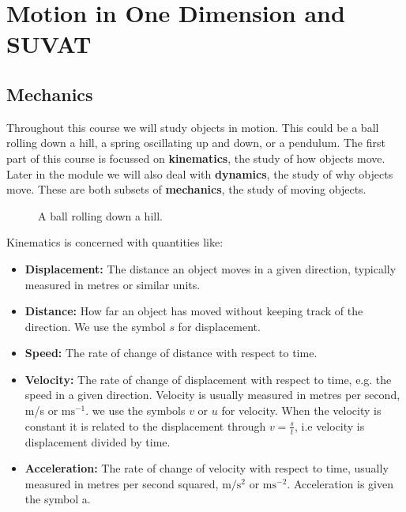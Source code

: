 
\chapter{Motion in One Dimension and SUVAT}
\label{sec: motion in 1D}
\section{Mechanics}
Throughout this course we will study objects in motion. This could be a ball rolling down a hill, a spring oscillating up and down, or a pendulum. The first part of this course is focussed on \textbf{kinematics}, the study of how objects move. Later in the module we will also deal with \textbf{dynamics}, the study of why objects move. These are both subsets of \textbf{mechanics}, the study of moving objects. \\


\begin{figure}[ht]
    \centering
    
    {\displaymathother
}
    \caption{A ball rolling down a hill.}
    \label{fig: ball on a hill}
\end{figure}

Kinematics is concerned with quantities like:
\begin{itemize}
\setlength{\itemsep}{-5pt}
    \item \textbf{Displacement:} The distance an object moves in a given direction, typically measured in metres or similar units.
    \item \textbf{Distance:} How far an object has moved without keeping track of the direction. We use the symbol $s$ for displacement.
    \item \textbf{Speed:} The rate of change of distance with respect to time.
    \item \textbf{Velocity:} The rate of change of displacement with respect to time, e.g. the speed in a given direction. Velocity is usually measured in metres per second, m/s or $\text{ms}^{-1}$. we use the symbols $v$ or $u$ for velocity. When the velocity is constant it is related to the displacement through $v=\frac{s}{t}$, i.e velocity is displacement divided by time.
    \item \textbf{Acceleration:} The rate of change of velocity with respect to time, usually measured in metres per second squared, $\text{m/}\text{s}^{2}$ or $\text{ms}^{-2}$. Acceleration is given the symbol a.
\end{itemize}

